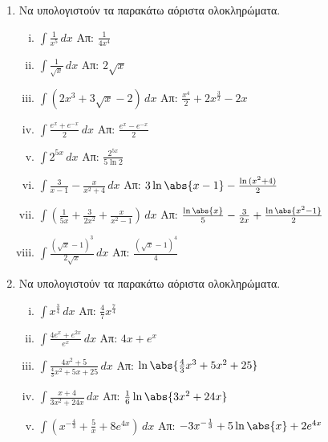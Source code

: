 


\geometry{top=2.2cm}
\pagestyle{askhseis}
\everymath{\displaystyle}

\setcounter{chapter}{1}


\begin{center}
  \minibox{\large\bfseries \textcolor{Col1}{Ασκήσεις στα Ολοκληρώματα}}
\end{center}

\vspace{\baselineskip}

\begin{enumerate}
  \item Να υπολογιστούν τα παρακάτω αόριστα ολοκληρώματα.
    \begin{enumerate}[i)]
      \item $ \int \frac{1}{x^{5}} \,{dx} $ \hfill Απ: $ \frac{1}{4x^{4}} $ 
      \item $ \int \frac{1}{\sqrt{x}} \,{dx} $ \hfill Απ: $ 2 \sqrt{x} $
      \item $ \int \left(2x^{3} + 3 \sqrt{x} -2\right) \,{dx} $ 
        \hfill Απ: $ \frac{x^{4}}{2} + 2 x^{\frac{3}{2}} -2x $ 
      \item $ \int \frac{e^{x}+e^{-x}}{2} \,{dx} $ 
        \hfill Απ: $ \frac{e^{x}-e^{-x}}{2} $ 
      \item $ \int 2^{5x} \,{dx} $ \hfill Απ: $ \frac{2^{5x}}{5 \ln{2}} $ 
      \item $ \int \frac{3}{x-1} - \frac{x}{x^{2}+4} \,{dx} $ 
        \hfill Απ:  $ 3 \ln{\abs{x-1}} - \frac{\ln{(x^{2}+4)}}{2} $
      \item $ \int \left(\frac{1}{5x} + \frac{3}{2x^{2}} + 
        \frac{x}{x^{2}-1} \right)  \,{dx} $ 
        \hfill Απ: $ \frac{\ln{\abs{x}}}{5} - \frac{3}{2x} + 
        \frac{\ln{\abs{x^{2}-1}}}{2} $ 
      \item $ \int \frac{(\sqrt{x} -1)^{3}}{2 \sqrt{x}}  \,{dx} $ 
        \hfill Απ: $ \frac{(\sqrt{x} -1)^{4}}{4} $ 
    \end{enumerate}

  \item Να υπολογιστούν τα παρακάτω αόριστα ολοκληρώματα.
    \begin{enumerate}[i)]
      \item $ \int x^{\frac{3}{4}} \,{dx} $ 
        \hfill Απ: $ \frac{4}{7} x^{\frac{7}{4}} $ 
      \item $ \int \frac{4e^{x}+e^{2x}}{e^{x}} \,{dx} $ \hfill Απ: $ 4x + e^{x} $ 
      \item $ \int \frac{4x^{2}+5}{\frac{4}{3} x^{2}+5x+25} \,{dx} $ 
        \hfill Απ: $ \ln{\abs{\frac{4}{3} x^{3} + 5x^{2}+25}} $
      \item $ \int \frac{x+4}{3x^{2}+24 x} \,{dx}  $
        \hfill Απ: $ \frac{1}{6} \ln{\abs{3x^{2}+24x}} $ 
      \item $ \int \left(x^{- \frac{4}{3}} + \frac{5}{x} + 8e^{4x}\right) \,{dx} $
        \hfill Απ: $ -3 x^{-\frac{1}{3}} + 5 \ln{\abs{x}} +2e^{4x} $ 
    \end{enumerate}


\end{enumerate}
